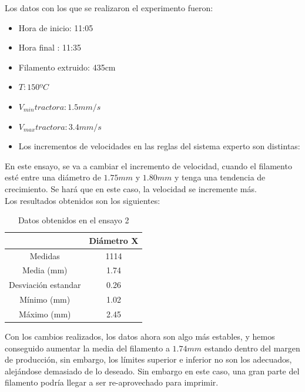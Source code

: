 Los datos con los que se realizaron el experimento fueron:

\begin{itemize}
	\item{Hora de inicio: 11:05}
	\item{Hora final : 11:35}
	\item{Filamento extruido: 435cm}
	\item{$T: 150ºC$}
	\item{$V_{min} tractora: 1.5 mm/s$}
	\item{$V_{max} tractora: 3.4 mm/s$}
	\item{Los incrementos de velocidades en las reglas del sistema experto son distintas:}
\end{itemize}

En este ensayo, se va a cambiar el incremento de velocidad, cuando el filamento esté entre una diámetro de $1.75 mm$ y $1.80 mm$ y tenga una tendencia de crecimiento. Se hará que en este caso, la velocidad se incremente más.\\

Los resultados obtenidos son los siguientes:

\begin{table}[H]
	\centering
	\begin{tabular}{cc}
		                    & Diámetro X \\ \hline
		Medidas             & 1114      \\
		Media (mm)          & 1.74       \\
		Desviación estandar & 0.26       \\
		Mínimo (mm)         & 1.02       \\
		Máximo (mm)         & 2.45      
	\end{tabular}
	\caption{Datos obtenidos en el ensayo 2}
	\label{tab:resl_ens1}
\end{table}

Con los cambios realizados, los datos ahora son algo más estables, y hemos conseguido aumentar la media del filamento a $1.74 mm$ estando dentro del margen de producción, sin embargo, los límites superior e inferior no son los adecuados, alejándose demasiado de lo deseado. Sin embargo en este caso, una gran parte del filamento podría llegar a ser re-aprovechado para imprimir.

